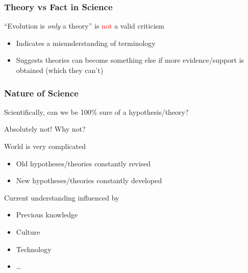\documentclass[10pt]{beamer}
\begin{document}
\begin{frame}[t]
\frametitle{Theory vs Fact in Science}
\vspace{0.5cm}
	
	``Evolution is \emph{only} a theory'' is \textcolor{red}{not} a valid criticism\\
	\smallskip
		\begin{itemize}
			\item Indicates a misunderstanding of terminology
			\smallskip
			\item Suggests theories can become something else if more evidence/support is obtained (which they can't)
		\end{itemize}
\end{frame}


\begin{frame}[t]
\frametitle{Nature of Science}
\vspace{0.5cm}

	Scientifically, can we be 100\% sure of a hypothesis/theory?\\
	
	\pause
	
	\begin{center}
		\textcolor{myblue}{Absolutely not! Why not?}\\
	\end{center}
	\vspace{0.5cm}
	
	\pause
	
	World is very complicated\\
		\smallskip
		\begin{itemize}
			\item Old hypotheses/theories constantly revised
			\smallskip
			\item New hypotheses/theories constantly developed\\
		\end{itemize}
	
	\vspace{0.5cm}
	
	Current understanding influenced by\\
		\smallskip
		\begin{itemize}
			\item Previous knowledge
			\smallskip
			\item Culture
			\smallskip
			\item Technology
			\smallskip
			\item \ldots
		\end{itemize}	
\end{frame}
\end{document}
